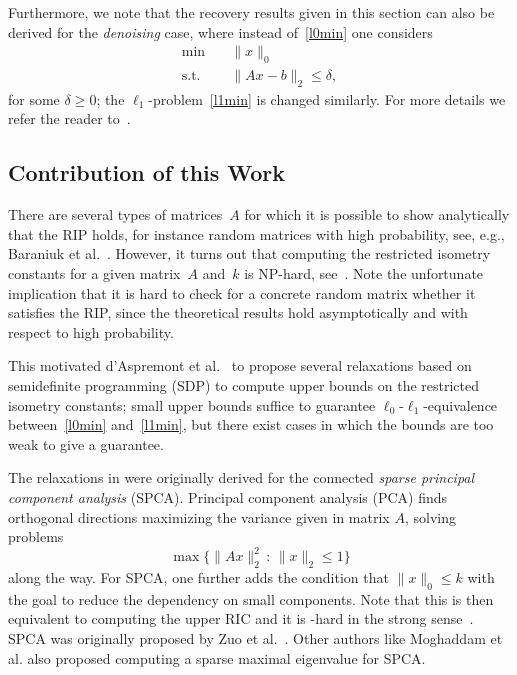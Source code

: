 \documentclass[journal]{IEEEtran}
\newcommand{\suchthat}{\,:\,}
\newcommand{\Norm}[2]{\lVert{#1}\rVert_{#2}}
\newcommand{\NP}{\text{NP}}
\begin{document}
Furthermore, we note that the recovery results given in this section can also be derived 
for the \emph{denoising} case, where instead of~\eqref{l0min} one considers
\begin{equation}\label{l0minDenoising}\tag{$P_0^\delta$}
 \begin{aligned}
  \min \quad & \Norm{x}{0} \\
  \text{s.t.} \quad & \Norm{Ax - b}{2} \leq \delta, 
 \end{aligned}
\end{equation}
for some $\delta \geq 0$; the $\ell_1$-problem~\eqref{l1min} is changed
similarly. For more details we refer the reader to~\cite{FouR13}.


\subsection{Contribution of this Work}

\noindent
There are several types of matrices~$A$ for which it is possible
to show analytically that the RIP holds, for instance random
matrices with high probability, see, e.g., Baraniuk et al.~\cite{BDDW08}.
However, it turns out that computing the restricted isometry
constants for a given matrix~$A$ and~$k$ is NP-hard, see~\cite{PT14}. 
Note the unfortunate implication that it is hard to check for a
concrete random matrix whether it satisfies the RIP, since the theoretical
results hold asymptotically and with respect to high probability.

This motivated d'Aspremont et al.~\cite{Asp08,Asp07} to propose several
relaxations based on semidefinite programming (SDP) to compute upper bounds on the restricted isometry
constants; small upper bounds suffice to guarantee
$\ell_0$-$\ell_1$-equivalence between~\eqref{l0min} and~\eqref{l1min}, but
there exist cases in which the bounds are too weak to give a guarantee.

The relaxations in \cite{Asp08,Asp07} were originally derived for the
connected \emph{sparse principal component analysis} (SPCA). Principal
component analysis (PCA) finds orthogonal directions maximizing the 
variance given in matrix $A$, solving problems
\[
\max \{ \Norm{A x}{2}^2 \suchthat \Norm{x}{2} \leq 1\}
\]
along the way. For SPCA, one further adds the condition that $\Norm{x}{0}
\leq k$ with the goal to reduce the dependency on small components. Note
that this is then equivalent to computing the upper RIC and it is \NP-hard
in the strong sense~\cite{PT14}. SPCA was
originally proposed by Zuo et al.~\cite{SPCA}. Other authors like Moghaddam et al.
\cite{sbSPCA} also proposed computing a sparse maximal eigenvalue for SPCA.
\end{document}
